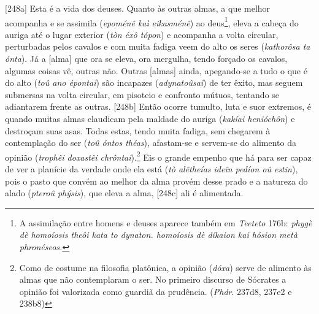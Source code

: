 {[}248a{]} Esta é a vida dos deuses. Quanto às outras almas, a que
melhor acompanha e se assimila (\emph{epoménê kaì} \emph{eikasménê}) ao
deus\footnote{A assimilação entre homens e deuses aparece também em
  \emph{Teeteto} 176b: \emph{phygè dè homoíosis theôi kata to dynaton.
  homoíosis dè díkaion kai hósion metà phronéseos.}}, eleva a cabeça do
auriga até o lugar exterior (\emph{tòn éxô tópon}) e acompanha a volta
circular, perturbadas pelos cavalos e com muita fadiga veem do alto os
seres (\emph{kathorôsa ta ónta}). Já a {[}alma{]} que ora se eleva, ora
mergulha, tendo forçado os cavalos, algumas coisas vê, outras não.
Outras {[}almas{]} ainda, apegando-se a tudo o que é do alto (\emph{toû
ano épontai}) são incapazes (\emph{adynatoûsai}) de ter êxito, mas
seguem submersas na volta circular, em pisoteio e confronto mútuos,
tentando se adiantarem frente as outras. {[}248b{]} Então ocorre
tumulto, luta e suor extremos, é quando muitas almas claudicam pela
maldade do auriga (\emph{kakíai henióchôn}) e destroçam suas asas. Todas
estas, tendo muita fadiga, sem chegarem à contemplação do ser (\emph{toû
óntos théas}), afastam-se e servem-se do alimento da opinião
(\emph{trophêi doxastêi chrôntai}).\footnote{Como de costume na
  filosofia platônica, a opinião (\emph{dóxa}) serve de alimento às
  almas que não contemplaram o ser. No primeiro discurso de Sócrates a
  opinião foi valorizada como guardiã da prudência. (\emph{Phdr}. 237d8,
  237e2 e 238b8)} Eis o grande empenho que há para ser capaz de ver a
planície da verdade onde ela está (\emph{tò alêtheías ideîn pedíon oû
estin}), pois o pasto que convém ao melhor da alma provém desse prado e
a natureza do alado (\emph{pteroû phýsis}), que eleva a alma, {[}248c{]}
ali é alimentada.

